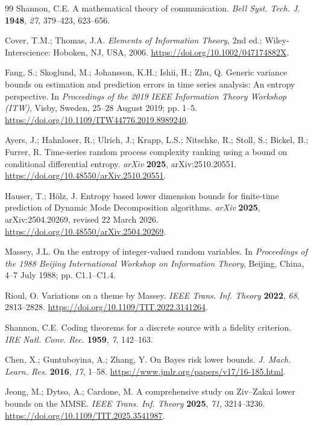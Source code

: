 \documentclass[applsci,supfile,submit,moreauthors]{Definitions/mdpi}
\begin{document}
\begin{thebibliography}{99}
\fontsize{8.5}{9}\selectfont
{}
Shannon, C.E. A mathematical theory of communication.
\emph{Bell Syst. Tech. J.} \textbf{1948}, \emph{27}, 379--423, 623--656.

Cover, T.M.; Thomas, J.A. \emph{Elements of Information Theory}, 2nd ed.;
Wiley-Interscience: Hoboken, NJ, USA, 2006.
\url{https://doi.org/10.1002/047174882X}.

Fang, S.; Skoglund, M.; Johansson, K.H.; Ishii, H.; Zhu, Q.
Generic variance bounds on estimation and prediction errors in time series
analysis: An entropy perspective. In \emph{Proceedings of the 2019 IEEE
Information Theory Workshop (ITW)}, Visby, Sweden, 25--28 August 2019;
pp. 1--5. \url{https://doi.org/10.1109/ITW44776.2019.8989240}.

Ayers, J.; Hahnloser, R.; Ulrich, J.; Krapp, L.S.; Nitschke, R.; Stoll, S.;
Bickel, B.; Furrer, R. Time-series random process complexity ranking using a
bound on conditional differential entropy. \emph{arXiv} \textbf{2025},
arXiv:2510.20551. \url{https://doi.org/10.48550/arXiv.2510.20551}.

Hauser, T.; H\"olz, J. Entropy based lower dimension bounds for finite-time
prediction of Dynamic Mode Decomposition algorithms. \emph{arXiv}
\textbf{2025}, arXiv:2504.20269, revised 22 March 2026.
\url{https://doi.org/10.48550/arXiv.2504.20269}.

Massey, J.L. On the entropy of integer-valued random variables. In
\emph{Proceedings of the 1988 Beijing International Workshop on Information
Theory}, Beijing, China, 4--7 July 1988; pp. C1.1--C1.4.

Rioul, O. Variations on a theme by Massey.
\emph{IEEE Trans. Inf. Theory} \textbf{2022}, \emph{68}, 2813--2828.
\url{https://doi.org/10.1109/TIT.2022.3141264}.

Shannon, C.E. Coding theorems for a discrete source with a fidelity
criterion. \emph{IRE Natl. Conv. Rec.} \textbf{1959}, \emph{7}, 142--163.

Chen, X.; Guntuboyina, A.; Zhang, Y. On Bayes risk lower bounds.
\emph{J. Mach. Learn. Res.} \textbf{2016}, \emph{17}, 1--58.
\url{https://www.jmlr.org/papers/v17/16-185.html}.

Jeong, M.; Dytso, A.; Cardone, M. A comprehensive study on Ziv--Zakai
lower bounds on the MMSE. \emph{IEEE Trans. Inf. Theory} \textbf{2025},
\emph{71}, 3214--3236.
\url{https://doi.org/10.1109/TIT.2025.3541987}.


\end{thebibliography}
\end{document}
